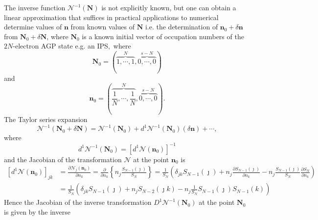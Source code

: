 \documentclass[aps,preprint]{revtex4}%
\begin{document}
The inverse function $\mathcal{N}^{-1}\left(  \mathbf{N}\right)  $ is not
explicitly known, but one can obtain a linear approximation that suffices in
practical applications to numerical determine values of $\mathbf{n}$ from
known values of $\mathbf{N}$ i.e. the determination of $\mathbf{n}_{0}%
+\delta\mathbf{n}$ from $\mathbf{N}_{0}+\delta\mathbf{N}$, where
$\mathbf{N}_{0}$ is a known initial vector of occupation numbers of the
$2N$-electron AGP state e.g. an IPS,\ where
\begin{equation}
\mathbf{N}_{0}=\left(  \overset{N}{\overbrace{1,\cdots,1}},\overset
{s-N}{\overbrace{0,\cdots,0}}\right)
\end{equation}
and
\begin{equation}
\mathbf{n}_{0}=\left(  \overset{N}{\overbrace{\frac{1}{N},\cdots,\frac{1}{N}}%
},\overset{s-N}{\overbrace{0,\cdots,0}}\right)  .
\end{equation}
The Taylor series expansion
\begin{equation}
\mathcal{N}^{-1}\left(  \mathbf{N}_{0}+\delta\mathbf{N}\right)  =\mathcal{N}%
^{-1}\left(  \mathbf{N}_{0}\right)  +d^{1}\mathcal{N}^{-1}\left(
\mathbf{N}_{0}\right)  \left(  \delta\mathbf{n}\right)  +\cdots,
\end{equation}
where
\begin{equation}
d^{1}\mathcal{N}^{-1}\left(  \mathbf{N}_{0}\right)  =\left[  d^{1}%
\mathcal{N}\left(  \mathbf{n}_{0}\right)  \right]  ^{-1}%
\end{equation}
and the Jacobian of the transformation $\mathcal{N}$ at the point
$\mathbf{n}_{0}$ is
\begin{align}
\left[  d^{1}\mathcal{N}\left(  \mathbf{n}_{0}\right)  \right]  _{jk}  &
=\frac{\partial\mathcal{N}_{j}\left(  \mathbf{n}_{0}\right)  }{\partial n_{k}%
}=\frac{\partial}{\partial n_{k}}\left\{  n_{j}\frac{S_{N-1}\left(
\jmath\right)  }{S_{N}}\right\}  =\frac{1}{S_{N}}\left(  \delta_{jk}%
S_{N-1}\left(  \jmath\right)  +n_{j}\frac{\partial S_{N-1}\left(
\jmath\right)  }{\partial n_{k}}-n_{j}\frac{S_{N-1}\left(  \jmath\right)
}{S_{N}}\frac{\partial S_{N}}{\partial n_{k}}\right) \nonumber\\
&  =\frac{1}{S_{N}}\left(  \delta_{jk}S_{N-1}\left(  \jmath\right)
+n_{j}S_{N-2}\left(  \jmath k\right)  -n_{j}\frac{1}{S_{N}}S_{N-1}\left(
\jmath\right)  S_{N-1}\left(  k\right)  \right)
\end{align}
Hence the Jacobian of the inverse transformation $D^{1}\mathcal{N}^{-1}\left(
\mathbf{N}_{0}\right)  $ at the point $\mathbf{N}_{0}$ is given by the inverse
\end{document}
